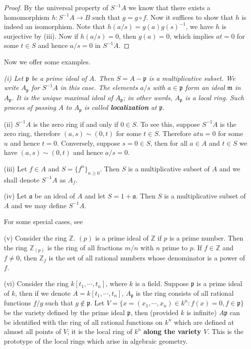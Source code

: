 \begin{proof}
By the universal property of $S^{-1}A$ we know that there exists a homomorphism $h:S^{-1}A\to B$ such that $g=g\circ f$. Now it suffices to show that $h$ is indeed an isomorphism. Note that $h\left( a/s \right) =g\left( a \right) g\left( s \right) ^{-1}$, we have $h$ is surjective by (iii). Now if $h(a/s)=0$, then $g(a)=0$, which implies $at=0$ for some $t\in S$ and hence $a/s=0$ in $S^{-1}A$.
\end{proof}
Now we offer some examples.
\begin{example}\em
(i) Let $\mathfrak{p}$ be a prime ideal of $A$. Then $S=A-\mathfrak{p}$ is a multiplicative subset. We write $A_\mathfrak{p}$ for $S^{-1}A$ in this case. The elements $a/s$ with $a\in\mathfrak{p}$ form an ideal $\mathfrak{m}$ in $A_\mathfrak{p}$. It is the unique maximal ideal of $A_\mathfrak{p}$; in other words, $A_\mathfrak{p}$ is a local ring. Such process of passing $A$ to $A_\mathfrak{p}$ is called \textbf{localization} at $\mathfrak{p}$.\par
(ii) $S^{-1}A$ is the zero ring if and only if $0\in S$. To see this, suppose $S^{-1}A$ is the zero ring, therefore $(a,s)\sim(0,t)$ for some $t\in S$. Therefore $atu=0$ for some $u$ and hence $t=0$. Conversely, suppose $s=0\in S$, then for all $a\in A$ and $t\in S$ we have $(a,s)\sim (0,t)$ and hence $a/s=0$.\par
(iii) Let $f\in A$ and $S=\{f^n\}_{n\ge 0}$. Then $S$ is a multiplicative subset of $A$ and we shall denote $S^{-1}A$ as $A_f$.\par
(iv) Let $\mathfrak{a}$ be an ideal of $A$ and let $S=1+\mathfrak{a}$. Then $S$ is a multiplicative subset of $A$ and we may define $S^{-1}A$.\par
For some special cases, see\par
(v) Consider the ring $\mathbb{Z}$. $(p)$ is a prime ideal of $\mathbb{Z}$ if $p$ is a prime number. Then the ring $\mathbb{Z}_{(p)}$ is the ring of all fractions $m/n$ with $n$ prime to $p$. If $f\in\mathbb{Z}$ and $f\ne 0$, then $\mathbb{Z}_f$ is the set of all rational numbers whose denominator is a power of $f$.\par
(vi) Consider the ring $k[t_1,\cdots,t_n]$, where $k$ is a field. Suppose $\mathfrak{p}$ is a prime ideal of $k$, then if we denote $A=k[t_1,\cdots,t_n]$, $A_\mathfrak{p}$ is the ring consists of all rational functions $f/g$ such that $g\notin\mathfrak{p}$. Let $V=\{x=(x_1,\cdots,x_n)\in k^n: f(x)=0, f\in\mathfrak{p}\}$ be the variety defined by the prime ideal $\mathfrak{p}$, then (provided $k$ is infinite) $A\mathfrak{p}$ can be identified with the ring of all rational functions on $k^n$ which are defined at almost all points of $V$; it is the local ring of $k^n$ \textbf{along the variety $V$}. This is the prototype of the local rings which arise in algebraic geometry.
\end{example}
